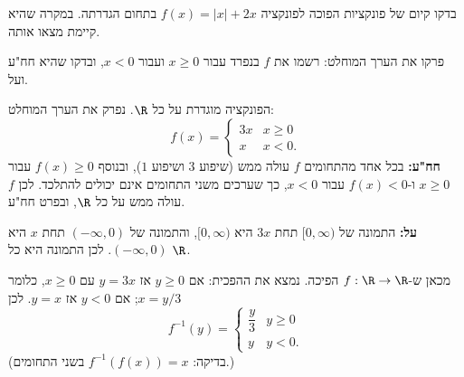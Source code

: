
\begin{question}
בדקו קיום של פונקציות הפוכה לפונקציה $f(x)=|x|+2x$ בתחום הגדרתה. במקרה שהיא קיימת מצאו אותה.
\end{question}

\begin{hint}
פרקו את הערך המוחלט: רשמו את $f$ בנפרד עבור $x\ge 0$ ועבור $x<0$, ובדקו שהיא חח"ע ועל.
\end{hint}

\begin{solution}
הפונקציה מוגדרת על כל $\R$. נפרק את הערך המוחלט:
\[ f(x)=\begin{cases} 3x & x\ge 0\\ x & x<0. \end{cases} \]
\textbf{חח"ע:} בכל אחד מהתחומים $f$ עולה ממש (שיפוע $3$ ושיפוע $1$), ובנוסף $f(x)\ge 0$ עבור $x\ge0$ ו-$f(x)<0$ עבור $x<0$, כך שערכים משני התחומים אינם יכולים להתלכד. לכן $f$ עולה ממש על כל $\R$, ובפרט חח"ע.

\textbf{על:} התמונה של $[0,\infty)$ תחת $3x$ היא $[0,\infty)$, והתמונה של $(-\infty,0)$ תחת $x$ היא $(-\infty,0)$. לכן התמונה היא כל $\R$.

מכאן ש-$f:\R\to\R$ הפיכה. נמצא את ההפכית: אם $y\ge 0$ אז $y=3x$ עם $x\ge 0$, כלומר $x=y/3$; אם $y<0$ אז $y=x$. לכן
\[ \boxed{f^{-1}(y)=\begin{cases} \dfrac{y}{3} & y\ge 0\\[2mm] y & y<0. \end{cases}} \]
(בדיקה: $f^{-1}(f(x))=x$ בשני התחומים.)
\end{solution}
